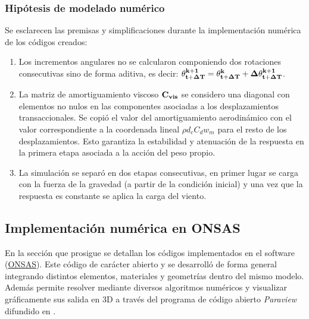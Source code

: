 
\subsubsection{Hipótesis de modelado numérico}\label{Sec:MET:HipotesisModeladoNumerico}
Se esclarecen las premisas y simplificaciones durante la implementación numérica de los códigos creados: 
\begin{enumerate}
	\item Los incrementos angulares no se calcularon componiendo dos rotaciones consecutivas sino de forma aditiva, es decir: $\bf{\theta_{t+\Delta T}^{k+1}}=\bf{\theta_{t+\Delta T}^{k}}+\bf{\Delta \theta_{t+\Delta T}^{k+1}}$.
	\item La matriz de amortiguamiento viscoso $\bf{C}_{vis}$ se considero una diagonal con elementos no nulos en las componentes asociadas a los desplazamientos transaccionales. Se copió el valor del amortiguamiento aerodinámico con el valor correspondiente a la coordenada lineal $\rho d_c C_d w_m$ para el resto de los desplazamientos. Esto garantiza la estabilidad y atenuación de la respuesta en la primera etapa asociada a la acción del peso propio.
	\item La simulación se separó en dos etapas consecutivas, en primer lugar se carga con la fuerza de la gravedad (a partir de la condición inicial) y una vez que la respuesta es constante se aplica la carga del viento. 
\end{enumerate}  



\subsection{Implementación numérica en ONSAS}\label{Sec:MET:ImplementNumeric}
En la sección que prosigue se detallan los códigos implementados en el software (\href{https://github.com/ONSAS/ONSAS.m/}{ONSAS}). Este código de carácter abierto y se desarrolló de forma general integrando distintos elementos, materiales y geometrías dentro del mismo modelo. Además permite resolver mediante diversos algoritmos numéricos y visualizar gráficamente sus salida en 3D a través del programa de código abierto \emph{Paraview} difundido en \citep{ahrens2005paraview}.

